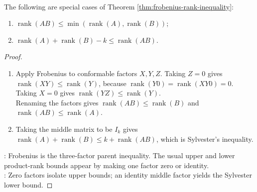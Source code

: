 \begin{corollary} \label{cor:frobenius-rank-inequality-special-cases} \\
The following are special cases of Theorem \ref{thm:frobenius-rank-inequality}:
\begin{enumerate}[label=(\roman*)]
\setlength{\itemsep}{0pt}
\item
$\operatorname{rank}(AB)\leq\min(\operatorname{rank}(A),\operatorname{rank}(B))$;
\item
$\operatorname{rank}(A)+\operatorname{rank}(B)-k\leq\operatorname{rank}(AB)$.
\end{enumerate}
\begin{proof}
\begin{enumerate}[label=(\roman*)]
\setlength{\itemsep}{0pt}
\item
Apply Frobenius to conformable factors $X,Y,Z$. Taking $Z=0$ gives $\operatorname{rank}(XY)\leq\operatorname{rank}(Y)$, because $\operatorname{rank}(Y0)=\operatorname{rank}(XY0)=0$. Taking $X=0$ gives $\operatorname{rank}(YZ)\leq\operatorname{rank}(Y)$.\\
Renaming the factors gives $\operatorname{rank}(AB)\leq\operatorname{rank}(B)$ and $\operatorname{rank}(AB)\leq\operatorname{rank}(A)$.
\item
Taking the middle matrix to be $I_k$ gives $\operatorname{rank}(A)+\operatorname{rank}(B)\leq k+\operatorname{rank}(AB)$, which is Sylvester's inequality.
\end{enumerate}
: Frobenius is the three-factor parent inequality. The usual upper and lower product-rank bounds appear by making one factor zero or identity.\\
: Zero factors isolate upper bounds; an identity middle factor yields the Sylvester lower bound.
\end{proof}
\end{corollary}

